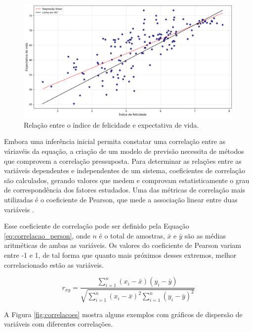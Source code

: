 \begin{figure}[H]
	\caption{\label{fig:regressao_exemplo}Relação entre o índice de felicidade e expectativa de vida.}
	\begin{center}
		\includegraphics[scale=0.4]{figuras/happiness_world.png}
	\end{center}
\end{figure}

Embora uma inferência inicial permita constatar uma correlação entre as váriavéis da equação, a criação de um modelo de previsão necessita de métodos que comprovem a correlação pressuposta. Para determinar as relações entre as variáveis dependentes e independentes de um sistema, coeficientes de correlação são calculados, gerando valores que medem e comprovam estatisticamente o grau de correspondência dos fatores estudados. Uma das métricas de correlação mais utilizadas é o coeficiente de Pearson, que mede a associação linear entre duas variáveis \cite{kirch2008}. 

Esse coeficiente de correlação pode ser definido pela Equação \ref{eq:correlacao_person}, onde $n$ é o total de amostras, $\bar{x}$ e $\bar{y}$ são as médias aritméticas de ambas as variáveis. Os valores do coeficiente de Pearson variam entre -1 e 1, de tal forma que quanto mais próximos desses extremos, melhor correlacionado estão as variáveis.

\begin{equation}
    r_{xy} = \frac{\sum_{i=1}^n (x_i - \bar{x})(y_i - \bar{y})}{\sqrt{\sum_{i=1}^n (x_i - \bar{x})^2 \sum_{i=1}^n (y_i - \bar{y})^2}}
    \label{eq:correlacao_person}
\end{equation}

A Figura \ref{fig:correlacoes} mostra alguns exemplos com gráficos de dispersão de variáveis com diferentes correlações.

